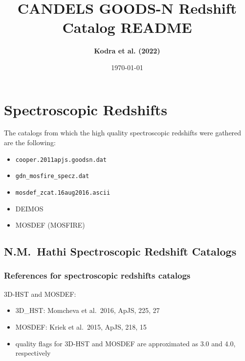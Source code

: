 \documentclass[12pt,onecolumn]{article}
\title{\textbf{CANDELS GOODS-N Redshift Catalog README}}
\author{\textbf{Kodra et al. (2022)}}
\date{\today}
\begin{document}
\maketitle




\section*{Spectroscopic Redshifts}

The catalogs from which the high quality spectroscopic redshifts were gathered are the following:
\begin{itemize}
\item \texttt{cooper.2011apjs.goodsn.dat}
\item \texttt{gdn\_mosfire\_specz.dat}
\item \texttt{mosdef\_zcat.16aug2016.ascii}
\item DEIMOS
\item MOSDEF (MOSFIRE)
\end{itemize}

\subsection*{N.M.~Hathi Spectroscopic Redshift Catalogs}
\subsubsection*{References for spectroscopic redshifts catalogs}

\noindent 3D-HST and MOSDEF:
\begin{itemize}
\item 3D\_HST: Momcheva et al.\ 2016, ApJS, 225, 27
\item MOSDEF: Kriek et al.\ 2015, ApJS, 218, 15
\item quality flags for 3D-HST and MOSDEF are approximated as 3.0 and 4.0, respectively
\end{itemize}
\end{document}
